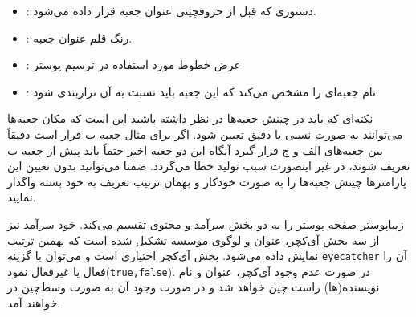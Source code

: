 \documentclass[debug,a0paper]{xebaposter}
\begin{document}
\begin{poster}
\begin{posterbox}[name=posterboxoption,column=1,span=2,below=posteroption,textborder=none
,headershape=rectangle,headerborder=none,textborder=coils,headershade=shadetbinverse]
\begin{itemize}
    \item {}:
    دستوری که قبل از حروفچینی عنوان جعبه قرار داده می‌شود.
    \item {}:
    رنگ قلم عنوان جعبه.
    \item {}:
    عرض خطوط مورد استفاده در ترسیم پوستر
    \item {}: 
    نام جعبه‌ای را مشخص می‌کند که این جعبه باید نسبت به آن ترازبندی شود.
\end{itemize}
\vspace{-2mm}
    نکته‌ای که باید در چینش جعبه‌ها در نظر داشته باشید این است که مکان جعبه‌ها می‌توانند به صورت نسبی یا دقیق تعیین شود. 
    اگر برای مثال جعبه ب قرار است دقیقاً بین جعبه‌های الف و ج قرار گیرد 
    آنگاه این دو جعبه اخیر حتماً باید پیش از جعبه ب تعریف شوند، در غیر اینصورت سبب تولید خطا می‌گردد. ضمنا می‌توانید بدون 
    تعیین این پارامترها چینش جعبه‌ها را به صورت خودکار و بهمان ترتیب تعریف به خود بسته واگذار نمایید.
\end{posterbox}
\begin{posterbox}[name=imagedataset,column=0,span=1,below=introduction,textborder=roundedleft]
{}
زیباپوستر صفحه پوستر را به دو بخش سرآمد  و محتوی تقسیم می‌کند. خود سرآمد نیز از سه بخش آی‌کچر، عنوان و لوگوی موسسه تشکیل 
شده است که بهمین ترتیب نمایش داده می‌شود. بخش آی‌کچر اختیاری است و می‌توان با گزینه \texttt{eyecatcher} آن را فعال یا غیرفعال 
نمود(\texttt{true,false}). در صورت عدم وجود آی‌کچر، عنوان و نام نویسنده‌(ها) راست چین خواهد شد و در صورت وجود آن به صورت 
وسط‌چین در خواهند آمد.


\end{posterbox}
\end{poster}
\end{document}
